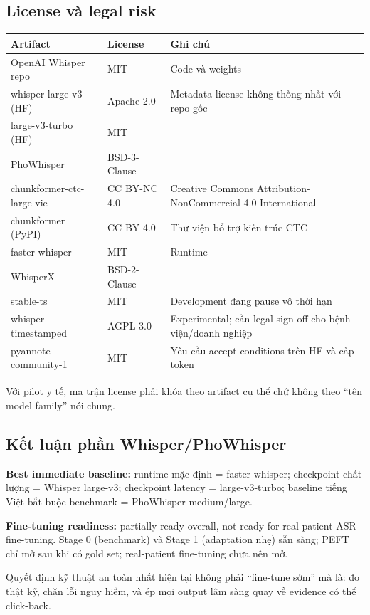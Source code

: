 \subsection{License và legal risk}

\begin{small}
\begin{longtable}{p{4cm} p{3cm} p{6.5cm}}
\toprule
\textbf{Artifact} & \textbf{License} & \textbf{Ghi chú} \\
\midrule
OpenAI Whisper repo & MIT & Code và weights \\
whisper-large-v3 (HF) & Apache-2.0 & Metadata license không thống nhất với repo gốc \\
large-v3-turbo (HF) & MIT & \\
PhoWhisper & BSD-3-Clause & \\
chunkformer-ctc-large-vie & CC BY-NC 4.0 & Creative Commons Attribution-NonCommercial 4.0 International \\
chunkformer (PyPI) & CC BY 4.0 & Thư viện bổ trợ kiến trúc CTC \\
faster-whisper & MIT & Runtime \\
WhisperX & BSD-2-Clause & \\
stable-ts & MIT & Development đang pause vô thời hạn \\
whisper-timestamped & AGPL-3.0 & Experimental; cần legal sign-off cho bệnh viện/doanh nghiệp \\
pyannote community-1 & MIT & Yêu cầu accept conditions trên HF và cấp token \\
\bottomrule
\end{longtable}
\end{small}

Với pilot y tế, ma trận license phải khóa theo artifact cụ thể chứ không theo ``tên model family'' nói chung.

\subsection{Kết luận phần Whisper/PhoWhisper}

\textbf{Best immediate baseline:} runtime mặc định = faster-whisper; checkpoint chất lượng = Whisper large-v3; checkpoint latency = large-v3-turbo; baseline tiếng Việt bắt buộc benchmark = PhoWhisper-medium/large.

\textbf{Fine-tuning readiness:} partially ready overall, not ready for real-patient ASR fine-tuning. Stage 0 (benchmark) và Stage 1 (adaptation nhẹ) sẵn sàng; PEFT chỉ mở sau khi có gold set; real-patient fine-tuning chưa nên mở.

Quyết định kỹ thuật an toàn nhất hiện tại không phải ``fine-tune sớm'' mà là: đo thật kỹ, chặn lỗi nguy hiểm, và ép mọi output lâm sàng quay về evidence có thể click-back.
